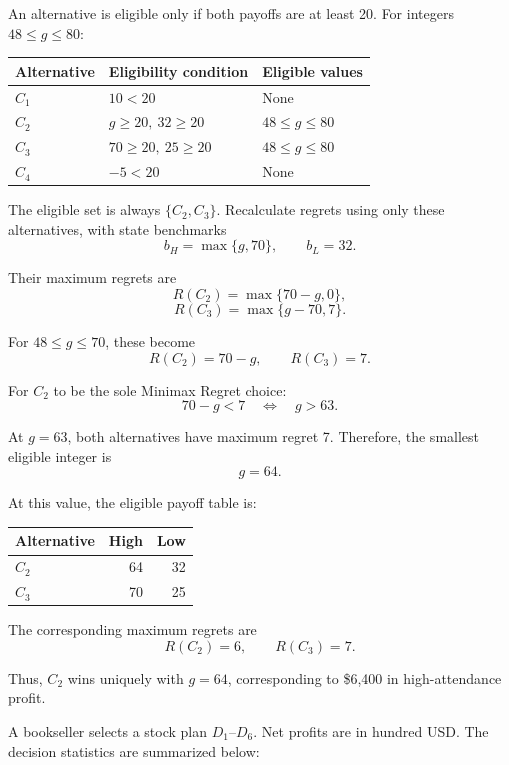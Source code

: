 An alternative is eligible only if both payoffs
are at least 20. For integers $48\le g\le80$:

\begin{center}
	\begin{tabular}{lll}\toprule
		Alternative & Eligibility condition & Eligible values\\\midrule
		$C_1$ & $10<20$ & None\\
		$C_2$ & $g\ge20,\ 32\ge20$ & $48\le g\le80$\\
		$C_3$ & $70\ge20,\ 25\ge20$ & $48\le g\le80$\\
		$C_4$ & $-5<20$ & None\\
		\bottomrule
	\end{tabular}
\end{center}

The eligible set is always $\{C_2,C_3\}$.
Recalculate regrets using only these alternatives,
with state benchmarks
\[
b_H=\max\{g,70\},\qquad b_L=32.
\]

Their maximum regrets are
\[
R(C_2)=\max\{70-g,0\},
\]
\[
R(C_3)=\max\{g-70,7\}.
\]

For $48\le g\le70$, these become
\[
R(C_2)=70-g,\qquad R(C_3)=7.
\]

For $C_2$ to be the sole Minimax Regret choice:
\[
70-g<7
\quad\Longleftrightarrow\quad g>63.
\]

At $g=63$, both alternatives have maximum regret 7.
Therefore, the smallest eligible integer is
\[
\boxed{g=64}.
\]

At this value, the eligible payoff table is:

\begin{center}\small\setlength{\tabcolsep}{4pt}
	\begin{tabular}{lrr}\toprule
		Alternative & High & Low\\ \midrule
		$C_2$ & 64 & 32\\
		$C_3$ & 70 & 25\\
		\bottomrule
	\end{tabular}
\end{center}

The corresponding maximum regrets are
\[
R(C_2)=6,\qquad R(C_3)=7.
\]

Thus, $C_2$ wins uniquely with $g=64$,
corresponding to \$6,400 in high-attendance profit.
\secInicio[sec:q2]



A bookseller selects a stock plan $D_1$--$D_6$. Net profits are in hundred USD. The decision statistics are summarized below:

